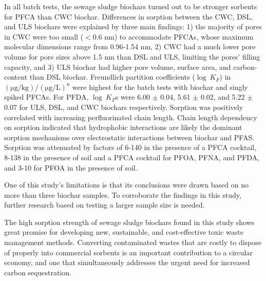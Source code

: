 In all batch tests, the sewage sludge biochars turned out to be stronger sorbents for PFCA than CWC biochar. Differences in sorption between the CWC, DSL, and ULS biochars were explained by three main findings: 1) the majority of pores in CWC were too small ($<$0.6 nm) to accommodate PFCAs, whose maximum molecular dimensions range from 0.96-1.54 nm, 2) CWC had a much lower pore volume for pore sizes above 1.5 nm than DSL and ULS, limiting the pores' filling capacity, and 3) ULS biochar had higher pore volume, surface area, and carbon-content than DSL biochar. Freundlich partition coefficients ($\log~K_F$) in $\mathrm{(\mu g/kg)/(\mu g/L)^n}$ were highest for the batch tests with biochar and singly spiked PFCAs. For PFDA, $\log~K_F$s were 6.00 $\pm$ 0.04, 5.61 $\pm$ 0.02, and 5.22 $\pm$ 0.07 for ULS, DSL, and CWC biochars respectively. Sorption was positively correlated with increasing perfluorinated chain length. Chain length dependency on sorption indicated that hydrophobic interactions are likely the dominant sorption mechanisms over electrostatic interactions between biochar and PFAS. Sorption was attenuated by factors of 6-140 in the presence of a PFCA cocktail, 8-138 in the presence of soil and a PFCA cocktail for PFOA, PFNA, and PFDA, and 3-10 for PFOA in the presence of soil. 

One of this study's limitations is that its conclusions were drawn based on no more than three biochar samples. To corroborate the findings in this study, further research based on testing a larger sample size is needed.

The high sorption strength of sewage sludge biochars found in this study shows great promise for developing new, sustainable, and cost-effective toxic waste management methods. Converting contaminated wastes that are costly to dispose of properly into commercial sorbents is an important contribution to a circular economy, and one that simultaneously addresses the urgent need for increased carbon sequestration.